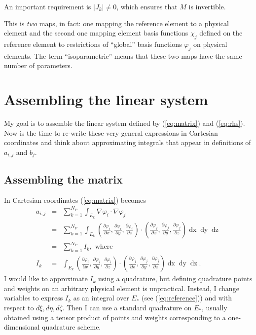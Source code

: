 \documentclass{article}
\newcommand{\tmop}[1]{\ensuremath{\operatorname{#1}}}
{ \theorembodyfont{\upshape} \newtheorem{note}{Note} }
{ \theorembodyfont{\upshape} \newtheorem{remark}{Remark} }
\begin{document}
\begin{note}
  An important requirement is $| J_k | \neq 0$, which ensures that $M$ is
  invertible.
\end{note}

\begin{remark}
  This is \emph{two} maps, in fact: one mapping the reference element to a
  physical element and the second one mapping element basis functions $\chi_j$
  defined on the reference element to restrictions of ``global'' basis
  functions $\varphi_j$ on physical elements. The term ``isoparametric'' means
  that these two maps have the same number of parameters.
\end{remark}

\section{Assembling the linear system}

My goal is to assemble the linear system defined by (\ref{eq:matrix}) and
(\ref{eq:rhs}). Now is the time to re-write these very general expressions in
Cartesian coordinates and think about approximating integrals that appear in
definitions of $a_{i, j}$ and $b_j$.

\subsection{Assembling the matrix}

In Cartesian coordinates (\ref{eq:matrix}) becomes
\begin{eqnarray}
  a_{i, j} & = & \sum_{k = 1}^{N_P} \int_{E_k} \nabla \varphi_i \cdot \nabla
  \varphi_j \nonumber\\
  & = & \sum_{k = 1}^{N_P} \int_{E_k} \left(\frac{\partial
  \varphi_i}{\partial x}, \frac{\partial \varphi_i}{\partial y},
  \frac{\partial \varphi_i}{\partial z} \right) \cdot \left(\frac{\partial
  \varphi_j}{\partial x}, \frac{\partial \varphi_j}{\partial y},
  \frac{\partial \varphi_j}{\partial z} \right) \tmop{dx} \tmop{dy} \tmop{dz}
  \nonumber\\
  & = & \sum_{k = 1}^{N_P} I_k, \text{ where} \nonumber\\
  I_k & = & \int_{E_k} \left(\frac{\partial \varphi_i}{\partial x},
  \frac{\partial \varphi_i}{\partial y}, \frac{\partial \varphi_i}{\partial z}
  \right) \cdot \left(\frac{\partial \varphi_j}{\partial x}, \frac{\partial
  \varphi_j}{\partial y}, \frac{\partial \varphi_j}{\partial z} \right)
  \tmop{dx} \tmop{dy} \tmop{dz} . \label{eq:ik}
\end{eqnarray}
I would like to approximate $I_k$ using a quadrature, but defining quadrature
points and weights on an arbitrary physical element is unpractical. Instead,
I change variables to express $I_k$ as an integral over $E_{\ast}$ (see
(\ref{eq:reference})) and with respect to $d \xi, d \eta, d \zeta$. Then I
can use a standard quadrature on $E_{\ast}$, usually obtained using a tensor
product of points and weights corresponding to a one-dimensional quadrature
scheme.
\end{document}
